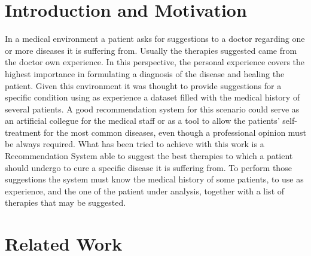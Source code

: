\section{Introduction and Motivation}
In a medical environment a patient asks for suggestions to a
doctor regarding one or more diseases it is suffering from. Usually the
therapies suggested came from the doctor own experience.
In this perspective, the personal experience covers the highest importance in
formulating a diagnosis of the disease and healing the patient.
Given this environment it was thought to provide suggestions for a specific 
condition using as experience a dataset filled with the medical history of
several patients.
A good recommendation system for this scenario could serve as an artificial 
collegue for the medical staff or as a tool to allow the patients'
self-treatment for the most common diseases, even though a professional
opinion must be always required.
What has been tried to achieve with this work is a Recommendation System able
to suggest the best therapies to which a patient should undergo to
cure a specific disease it is suffering from. To perform those
suggestions the system must know the medical
history of some patients, to use as experience, and the one of the patient
under analysis, together with a list of therapies that may be suggested. 

\section{Related Work}
